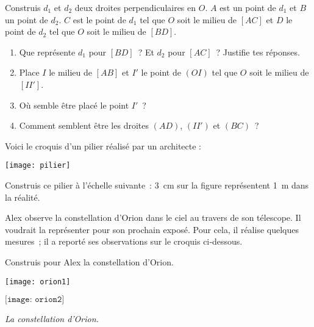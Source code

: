 \begin{exercice}
Construis $d_1$ et $d_2$ deux droites perpendiculaires en $O$. $A$ est un point de $d_1$ et $B$ un point de $d_2$. $C$ est le point de $d_1$ tel que $O$ soit le milieu de $[AC]$ et $D$ le point de $d_2$ tel que $O$ soit le milieu de $[BD]$.
\begin{enumerate}
 \item Que représente $d_1$ pour $[BD]$ ? Et $d_2$ pour $[AC]$ ? Justifie tes réponses.
 \item Place $I$ le milieu de $[AB]$ et $I'$ le point de $(OI)$ tel que $O$ soit le milieu de $[II']$.
 \item Où semble être placé le point $I'$ ?
 \item Comment semblent être les droites $(AD)$, $(II')$ et $(BC)$ ?
 \end{enumerate}
\end{exercice}


\begin{exercice}
Voici le croquis d'un pilier réalisé par un architecte :
\begin{center} \texttt{[image: pilier]} \end{center}
Construis ce pilier à l’échelle suivante : 3 cm sur la figure représentent 1 m dans la réalité.
\end{exercice}

\newpage

\begin{exercice}[Orion]
Alex observe la constellation d'Orion dans le ciel au travers de son télescope. Il voudrait la représenter pour son prochain exposé. Pour cela, il réalise quelques mesures ; il a reporté ses observations sur le croquis ci‑dessous.

Construis pour Alex la constellation d'Orion.
\begin{center} \texttt{[image: orion1]} \end{center}
\begin{center} $\boxed{\texttt{[image: orion2]}}$ 

{\footnotesize\emph{La constellation d'Orion.}} \end{center}
\end{exercice}
